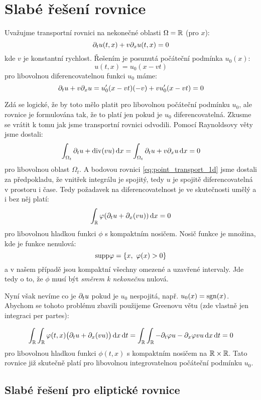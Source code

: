 \section{Slabé řešení rovnice}
Uvažujme transportní rovnici na nekonečné oblasti $\Omega = {\mathbb R}$ (pro $x$):
\begin{equation}
    \label{eq:point_transport_1d}
    \partial_t u(t,x) + v\partial_x u(t,x) =0 
\end{equation}
kde $v$ je konstantní rychlost. Řešením je posunutá počáteční podmínka $u_0(x)$:
\[
    u(t,x) = u_0(x-vt)
\]
pro libovolnou diferencovatelnou funkci $u_0$ máme:
\[
    \partial_t u + v\partial_x u=u_0'(x-vt)(-v) + vu_0'(x-vt)=0
\]

Zdá se logické, že by toto mělo platit pro libovolnou počáteční podmínku $u_0$, ale rovnice je formulována tak, že 
to platí jen pokud je $u_0$ diferencovatelná. Zkusme se vrátit k tomu jak jsme transportní rovnici odvodili. Pomocí Raynoldsovy věty jsme dostali:
\[
    \int_{\Omega_t} \partial_t u + {\rm div}(v u) \,{\rm d} x= \int_{\Omega_t} \partial_t u + v\partial_x u \,{\rm d} x= 0
\]
pro libovolnou oblast $\Omega_t$. A bodovou rovnici \eqref{eq:point_transport_1d} jsme dostali za předpokladu, že vnitřek integrálu je spojitý, 
tedy $u$ je spojitě diferencovatelná v prostoru i čase. Tedy požadavek na diferencovatelnost je ve skutečnosti umělý a i bez něj platí:
\[
    \int_{\mathbb R} \varphi(\partial_t u + \partial_x(vu)) \,{\rm d} x = 0
\]
pro libovolnou hladkou funkci $\phi$ s kompaktním nosičem. Nosič funkce je množina, kde je funkce nenulová:
\[
    {\rm supp} \varphi = \{ x,\ \varphi(x) > 0\}
\]
a v našem případě jsou kompaktní všechny omezené a uzavřené intervaly. Jde tedy o to, že $\phi$ musí být \emph{směrem k nekonečnu} nulová.

Nyní však nevíme co je $\partial_t u$ pokud je $u_0$ nespojitá, např. $u_0(x)=\operatorname{sgn}(x)$. Abychom se tohoto problému zbavili použijeme Greenovu větu 
(zde vlastně jen integraci per partes):

\[
    \int_{\mathbb R} \int_{\mathbb R} \varphi(t,x)\big(\partial_t u + \partial_x(vu)\big) \,{\rm d} x \,{\rm d} t= 
    \int_{\mathbb R} \int_{\mathbb R} -\partial_t \varphi u - \partial_x \varphi vu \,{\rm d} x \,{\rm d} t = 0
\]
pro libovolnou hladkou funkci $\phi(t,x)$ s kompaktním nosičem na ${\mathbb R} \times {\mathbb R}$.
Tato rovnice již skutečně platí pro libovolnou integrovatelnou počáteční podmínku $u_0$.


\subsection{Slabé řešení pro eliptické rovnice}



